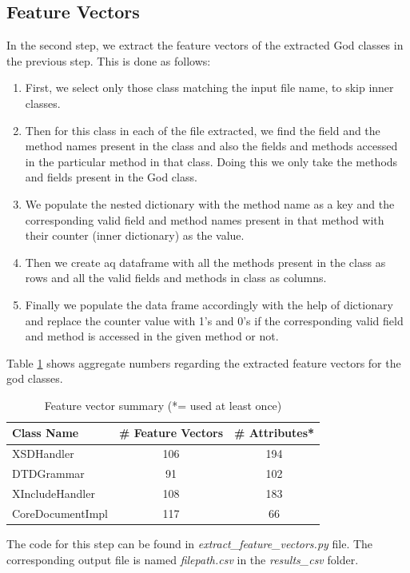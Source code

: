 \documentclass{article}
\begin{document}
\subsection{Feature Vectors}
In the second step, we extract the feature vectors of the extracted God classes in the previous step. This is done as follows:
\begin{enumerate}
    \item First, we select only those class matching the input file name, to skip inner classes.
    \item Then for this class in each of the file extracted, we find the field and 
    the method names present in the class and also the fields and methods accessed in the particular method in that class.
    Doing this we only take the methods and fields present in the God class.
    \item We populate the nested dictionary with the method name as a key and the corresponding valid field and method names present in that method with their counter (inner dictionary) as the value. 
    \item Then we create aq dataframe with all the methods present in the class as rows and all the valid fields and methods in class as columns.
    \item Finally we populate the data frame accordingly with the help of dictionary and replace the counter value with 1's and 0's if the corresponding valid field and method is accessed in the given method or not.
\end{enumerate}

Table \ref{tab:feat_vec} shows aggregate numbers regarding the extracted feature vectors for the god classes.
\begin{table}[]
    \centering
    \begin{tabular}{lcc}
        \hline
        \textbf{Class Name} &\textbf{\# Feature Vectors} & \textbf{\# Attributes*}\\
        \hline\hline
        {XSDHandler} & {106} & {194}\\
        {DTDGrammar} & {91} & {102}\\
        {XIncludeHandler} & {108} & {183}\\
        {CoreDocumentImpl} & {117} & {66}\\
        \hline
    \end{tabular}
    \caption{Feature vector summary (*= used at least once)}
    \label{tab:feat_vec}
\end{table}

The code for this step can be found in \textit{extract\_feature\_vectors.py} file.
The corresponding output file is named \textit{filepath.csv} in the \textit{results\_csv} folder.
\end{document}
